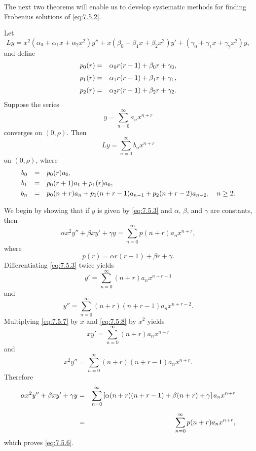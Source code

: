 The next two theorems will enable us to develop systematic methods for finding Frobenius solutions
of \eqref{eq:7.5.2}.

\begin{theorem}
  \color{blue}
  \label{thmtype:7.5.1} Let
  \[
    Ly= x^{2}(\alpha_{0}+\alpha_{1}x+\alpha_{2}x^{2})y''+x(\beta_{0}+\beta_{1}x+\beta_{2}x^{2})y' +(\gamma_{0}+\gamma_{1}x+\gamma_{2}x^{2})y,
  \]
  and define
  \begin{eqnarray*}
    p_{0}(r)&=&\alpha_{0}r(r-1)+\beta_{0}r+\gamma_{0},\\[1\jot] p_{1}(r)&=&\alpha_{1}r(r-1)+\beta_{1}r+\gamma_{1},\\[1\jot] p_{2}(r)&=&\alpha_{2}r(r-1)+\beta_{2}r+\gamma_{2}.\\
  \end{eqnarray*}
  Suppose the series
  \begin{equation}
    \label{eq:7.5.3}y=\sum_{n=0}^{\infty}a_{n}x^{n+r}
  \end{equation}
  converges on $(0,\rho)$. Then
  \begin{equation}
    \label{eq:7.5.4}Ly=\sum_{n=0}^{\infty}b_{n}x^{n+r}
  \end{equation}
  on $(0,\rho)$, where
  \begin{equation}
    \label{eq:7.5.5}
    \begin{array}{ccl}
      b_{0} & = & p_{0}(r)a_{0},                                                       \\[1\jot]
      b_{1} & = & p_{0}(r+1)a_{1}+p_{1}(r)a_{0},                                       \\[1\jot]
      b_{n} & = & p_{0}(n+r)a_{n}+p_{1}(n+r-1)a_{n-1}+p_{2}(n+r-2)a_{n-2},\quad n\ge2.
    \end{array}
  \end{equation}
\end{theorem}

\proof We begin by showing that if $y$ is given by \eqref{eq:7.5.3} and $\alpha$, $\beta$, and
$\gamma$ are constants, then
\begin{equation}
  \label{eq:7.5.6}\alpha x^{2}y''+\beta xy'+\gamma y= \sum_{n=0}^{\infty}p(n+r)a_{n}x^{n+r},
\end{equation}
where
\[
  p(r)=\alpha r(r-1)+\beta r+\gamma.
\]
Differentiating \eqref{eq:7.5.3} twice yields
\begin{equation}
  \label{eq:7.5.7}y'=\sum_{n=0}^{\infty}(n+r)a_{n}x^{n+r-1}
\end{equation}
and
\begin{equation}
  \label{eq:7.5.8}y''=\sum_{n=0}^{\infty}(n+r)(n+r-1)a_{n}x^{n+r-2}.
\end{equation}
Multiplying \eqref{eq:7.5.7} by $x$ and \eqref{eq:7.5.8} by $x^{2}$ yields
\[
  xy'=\sum_{n=0}^{\infty}(n+r)a_{n}x^{n+r}
\]
and
\[
  x^{2}y''=\sum_{n=0}^{\infty}(n+r)(n+r-1)a_{n}x^{n+r}.
\]
Therefore
\begin{eqnarray*}
  \alpha x^{2}y''+\beta xy'+\gamma y & = & \sum_{n=0}^{\infty}\left[\alpha(n+r)(n+r-1)+\beta(n+r)+\gamma\right]a_{n}x^{n+r} \\[2\jot]
                                     & = & \sum_{n=0}^{\infty}p(n+r)a_{n}x^{n+r},
\end{eqnarray*}
which proves \eqref{eq:7.5.6}.

